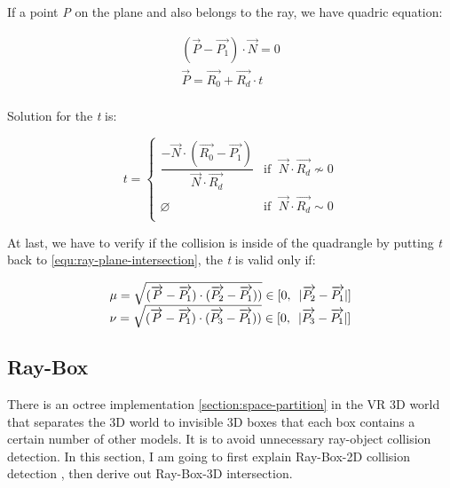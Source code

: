 If a point \emph{P} on the plane and also belongs to the ray, we have quadric equation:

\begin{equation}
\label{equ:ray-plane-intersection}
\begin{array}{lr}
(\overrightarrow{P} - \overrightarrow{P_1}) \cdot \overrightarrow{N} = 0\\
\overrightarrow{P} = \overrightarrow{R_0} + \overrightarrow{R_d} \cdot t\\
\end{array}
\end{equation}

Solution for the \emph{t} is:

\[
t =
\begin{cases}
\dfrac{-\overrightarrow{N} \cdot (\overrightarrow{R_0} - \overrightarrow{P_1})}{\overrightarrow{N} \cdot \overrightarrow{R_d}} & \text{if }\;\overrightarrow{N} \cdot \overrightarrow{R_d} \nsim 0\\
\varnothing & \text{if }\;\overrightarrow{N} \cdot \overrightarrow{R_d} \sim 0\\
\end{cases}
\]

At last, we have to verify if the collision is inside of the quadrangle by putting \emph{t} back to \ref{equ:ray-plane-intersection}, \cite{user3146587.ray-plane.2014} the \emph{t} is valid only if:

\[
\begin{array}{lr}
\mu = \sqrt{(\overrightarrow{P} - \overrightarrow{P_1}) \cdot (\overrightarrow{P_2} - \overrightarrow{P_1}))} \in [0,\enspace\lvert \overrightarrow{P_2} - \overrightarrow{P_1} \rvert]\\
\nu = \sqrt{(\overrightarrow{P} - \overrightarrow{P_1}) \cdot (\overrightarrow{P_3} - \overrightarrow{P_1}))} \in [0,\enspace\lvert \overrightarrow{P_3} - \overrightarrow{P_1} \rvert]\\
\end{array}
\]

\subsection{Ray-Box}
\label{section:ray-box}

There is an octree implementation \ref{section:space-partition} in the VR 3D world that separates the 3D world to invisible 3D boxes that each box contains a certain number of other models. It is to avoid unnecessary ray-object collision detection. In this section, I am going to first explain Ray-Box-2D collision detection \cite{tavian.ray-box-2d.2011}, then derive out Ray-Box-3D intersection.

